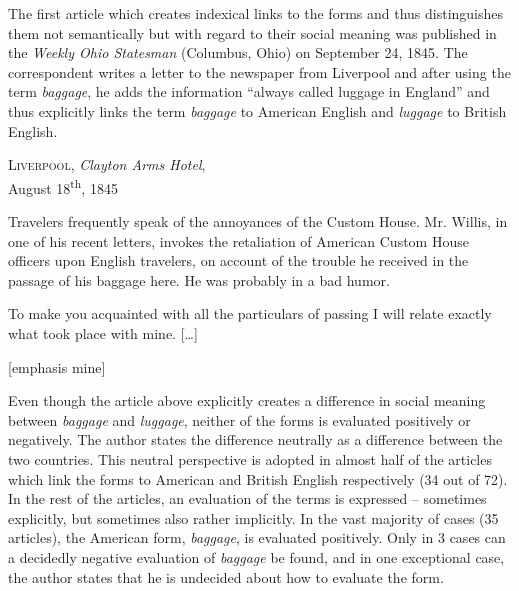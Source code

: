 The first article which creates indexical links to the forms and thus distinguishes them not semantically but with regard to their social meaning was published in the \emph{Weekly Ohio Statesman} (Columbus, Ohio) on September 24, 1845. The correspondent writes a letter to the newspaper from Liverpool and after using the term \emph{baggage}, he adds the information “always called luggage in England” and thus explicitly links the term \emph{baggage} to American English and \emph{luggage} to British English.

\begin{ipquote}
{\centering
{}

\raggedleft
\textsc{Liverpool}, \textit{Clayton Arms Hotel},\\
August 18\textsuperscript{th}, 1845

Travelers frequently speak of the annoyances of the Custom House. Mr. Willis, in one of his recent letters, invokes the retaliation of American Custom House officers upon English travelers, on account of the trouble he received in the passage of his baggage here. He was probably in a bad humor.}

{To make you acquainted with all the particulars of passing  I will relate exactly what took place with mine. {[…]}

\raggedleft
{[emphasis mine]}\\
}
\end{ipquote}

Even though the article above explicitly creates a difference in social meaning between \emph{baggage} and \emph{luggage}, neither of the forms is evaluated positively or negatively. The author states the difference neutrally as a difference between the two countries. This neutral perspective is adopted in almost half of the articles which link the forms to American and British English respectively (34 out of 72). In the rest of the articles, an evaluation of the terms is expressed – sometimes explicitly, but sometimes also rather implicitly. In the vast majority of cases (35 articles), the American form, \emph{baggage}, is evaluated positively. Only in 3 cases can a decidedly negative evaluation of \emph{baggage} be found, and in one exceptional case, the author states that he is undecided about how to evaluate the form.

